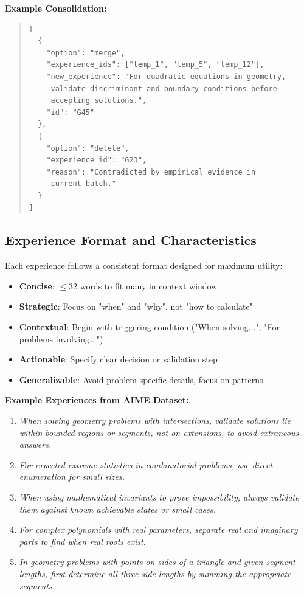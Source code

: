 \textbf{Example Consolidation:}
\begin{quote}
\small
\begin{verbatim}
[
  {
    "option": "merge",
    "experience_ids": ["temp_1", "temp_5", "temp_12"],
    "new_experience": "For quadratic equations in geometry,
     validate discriminant and boundary conditions before
     accepting solutions.",
    "id": "G45"
  },
  {
    "option": "delete",
    "experience_id": "G23",
    "reason": "Contradicted by empirical evidence in
     current batch."
  }
]
\end{verbatim}
\end{quote}

\subsection{Experience Format and Characteristics}

Each experience follows a consistent format designed for maximum utility:

\begin{itemize}
    \item \textbf{Concise}: $\leq 32$ words to fit many in context window
    \item \textbf{Strategic}: Focus on "when" and "why", not "how to calculate"
    \item \textbf{Contextual}: Begin with triggering condition ("When solving...", "For problems involving...")
    \item \textbf{Actionable}: Specify clear decision or validation step
    \item \textbf{Generalizable}: Avoid problem-specific details, focus on patterns
\end{itemize}

\textbf{Example Experiences from AIME Dataset:}

\begin{enumerate}
    \item[\texttt{[G0]}] \textit{When solving geometry problems with intersections, validate solutions lie within bounded regions or segments, not on extensions, to avoid extraneous answers.}

    \item[\texttt{[G1]}] \textit{For expected extreme statistics in combinatorial problems, use direct enumeration for small sizes.}

    \item[\texttt{[G10]}] \textit{When using mathematical invariants to prove impossibility, always validate them against known achievable states or small cases.}

    \item[\texttt{[G21]}] \textit{For complex polynomials with real parameters, separate real and imaginary parts to find when real roots exist.}

    \item[\texttt{[G37]}] \textit{In geometry problems with points on sides of a triangle and given segment lengths, first determine all three side lengths by summing the appropriate segments.}
\end{enumerate}

